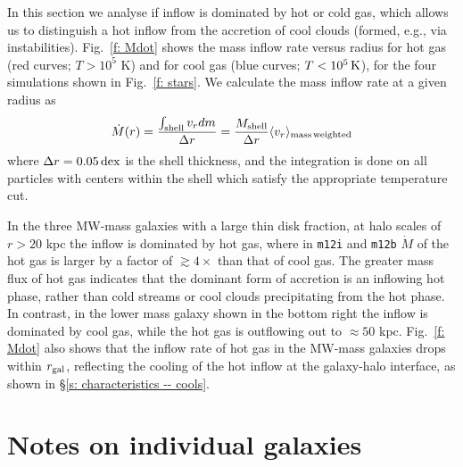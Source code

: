 \documentclass[fleqn,usenatbib]{mnras}
\newcommand{\Mdot}{\dot{M}}
\begin{document}
In this section we analyse if inflow is dominated by hot or cold gas, which allows us to distinguish a hot inflow from the accretion of cool clouds (formed, e.g., via instabilities).
Fig.~\ref{f: Mdot} shows the mass inflow rate versus radius for hot gas (red curves; $T>10^5$ K) and for cool gas (blue curves; $T < 10^5\,{\rm K}$),  for the four simulations shown in Fig.~\ref{f: stars}. 
We calculate the mass inflow rate at a given radius as
\begin{equation}
     \Mdot(r) = \frac{\int_{\rm shell} v_r dm}{\Delta r} = \frac{M_{\rm shell}}{\Delta r} \langle v_r\rangle_{\rm mass\, weighted}
     \label{e: Mdot}
\end{equation}
where $\Delta r=0.05\,{\rm dex}$ is the shell thickness, and the integration is done on all particles with centers within the shell which satisfy the appropriate temperature cut. 

In the three MW-mass galaxies with a large thin disk fraction, at halo scales of $r>20$ kpc the inflow is dominated by hot gas, where in \texttt{m12i} and \texttt{m12b} $\Mdot$ of the hot gas is larger by a factor of $\gtrsim 4\times$ than that of cool gas.
The greater mass flux of hot gas indicates that the dominant form of accretion is an inflowing hot phase, rather than cold streams or cool clouds precipitating from the hot phase.
In contrast, in the lower mass galaxy shown in the bottom right the inflow is dominated by cool gas, while the hot gas is outflowing out to $\approx50$ kpc.
Fig.~\ref{f: Mdot} also shows that the inflow rate of hot gas in the MW-mass galaxies drops within $r_{\rm gal}$, reflecting the cooling of the hot inflow at the galaxy-halo interface, as shown in \S\ref{s: characteristics -- cools}.

\section{Notes on individual galaxies}

\label{s: appendix-individual}
\end{document}
